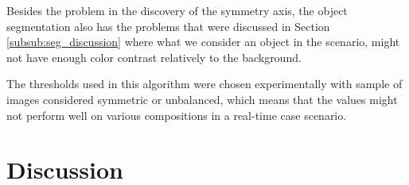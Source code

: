 Besides the problem in the discovery of the symmetry axis, the object segmentation also has the problems that were discussed in Section \ref{subsub:seg_discussion} where what we consider an object in the scenario, might not have enough color contrast relatively to the background.

The thresholds used in this algorithm were chosen experimentally with sample of images considered symmetric or unbalanced, which means that the values might not perform well on various compositions in a real-time case scenario.


\section{Discussion}
\label{sec:system_discussion}
